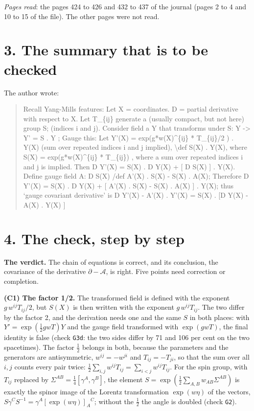 \documentclass[
  10pt,
]{article}
\begin{document}
\emph{Pages read}: the pages 424 to 426 and 432 to 437 of the journal
(pages 2 to 4 and 10 to 15 of the file). The other pages were not read.

\hypertarget{the-summary-that-is-to-be-checked}{%
\section{3. The summary that is to be
checked}\label{the-summary-that-is-to-be-checked}}

The author wrote:

\begin{quote}
Recall Yang-Mills features: Let X = coordinates. D = partial derivative
with respect to X. Let T\_\{ij\} generate a (usually compact, but not
here) group S; (indices i and j). Consider field a Y that transforms
under S: Y -\textgreater{} Y' = S . Y ; Gauge this: Let Y'(X) =
exp(g*w(X)\^{}\{ij\} * T\_\{ij\}/2 ) . Y(X) (sum over repeated indices i
and j implied), \textbackslash def S(X) . Y(X), where S(X) =
exp(g*w(X)\^{}\{ij\} * T\_\{ij\}) , where a sum over repeated indices i
and j is implied. Then D Y'(X) = S(X) . D Y(X) + {[} D S(X) {]} . Y(X).
Define gauge field A: D S(X) /def A'(X) . S(X) - S(X) . A(X); Therefore
D Y'(X) = S(X) . D Y(X) + {[} A'(X) . S(X) - S(X) . A(X) {]} . Y(X);
thus `gauge covariant derivative' is D Y'(X) - A'(X) . Y'(X) = S(X) .
{[}D Y(X) - A(X) . Y(X) {]}
\end{quote}

\hypertarget{the-check-step-by-step}{%
\section{4. The check, step by step}\label{the-check-step-by-step}}

\textbf{The verdict.} The chain of equations is correct, and its
conclusion, the covariance of the derivative \(\partial-\mathcal A\), is
right. Five points need correction or completion.

\textbf{(C1) The factor 1/2.} The transformed field is defined with the
exponent \(g\,w^{ij}T_{ij}/2\), but \(S(X)\) is then written with the
exponent \(g\,w^{ij}T_{ij}\). The two differ by the factor 2, and the
derivation needs one and the same \(S\) in both places: with
\(Y'=\exp(\tfrac12gwT)Y\) and the gauge field transformed with
\(\exp(gwT)\), the final identity is false (check \texttt{G3d}: the two
sides differ by 71 and 106 per cent on the two spacetimes). The factor
\(\tfrac12\) belongs in both, because the parameters and the generators
are antisymmetric, \(w^{ij}=-w^{ji}\) and \(T_{ij}=-T_{ji}\), so that
the sum over all \(i,j\) counts every pair twice:
\(\tfrac12\sum_{i,j}w^{ij}T_{ij}=\sum_{i<j}w^{ij}T_{ij}\). For the spin
group, with \(T_{ij}\) replaced by
\(\Sigma^{AB}=\tfrac14[\gamma^A,\gamma^B]\), the element
\(S=\exp(\tfrac12\sum_{A,B}w_{AB}\Sigma^{AB})\) is exactly the spinor
image of the Lorentz transformation \(\exp(w\eta)\) of the vectors,
\(S\gamma^CS^{-1}=\gamma^A[\exp(w\eta)]_A{}^C\); without the
\(\tfrac12\) the angle is doubled (check \texttt{G2}).
\end{document}
